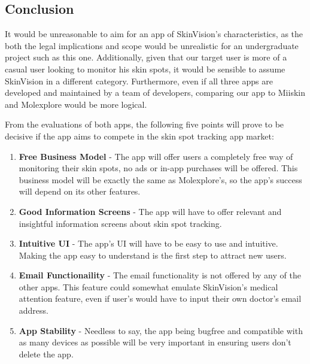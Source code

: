 \subsection{Conclusion}
It would be unreasonable to aim for an app of SkinVision's characteristics, as the both the legal implications and scope would be unrealistic for an undergraduate project such as this one. Additionally, given that our target user is more of a casual user looking to monitor his skin spots, it would be sensible to assume SkinVision in a different category. Furthermore, even if all three apps are developed and maintained by a team of developers, comparing our app to Miiskin and Molexplore would be more logical.

From the evaluations of both apps, the following five points will prove to be decisive if the app aims to compete in the skin spot tracking app market:
\begin{enumerate}
    \item \textbf{Free Business Model} - The app will offer users a completely free way of monitoring their skin spots, no ads or in-app purchases will be offered. This business model will be exactly the same as Molexplore's, so the app's success will depend on its other features.
    \item \textbf{Good Information Screens} - The app will have to offer relevant and insightful information screens about skin spot tracking.
    \item \textbf{Intuitive UI} - The app's UI will have to be easy to use and intuitive. Making the app easy to understand is the first step to attract new users.
    \item \textbf{Email Functionaility} - The email functionality is not offered by any of the other apps. This feature could somewhat emulate SkinVision's medical attention feature, even if user's would have to input their own doctor's email address.
    \item \textbf{App Stability} - Needless to say, the app being bugfree and compatible with as many devices as possible will be very important in ensuring users don't delete the app.
\end{enumerate}


